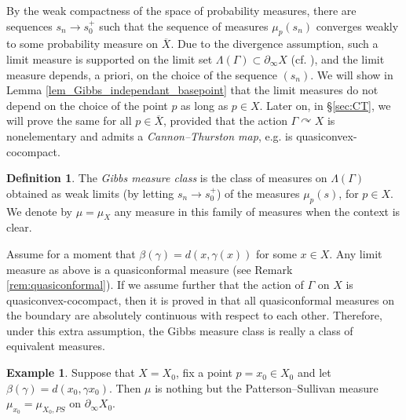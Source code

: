 \documentclass[12pt]{amsbook}%
\theoremstyle{definition}
\newtheorem{defi}[thm]{Definition}
\newtheorem{example}[thm]{Example}
\theoremstyle{remark}
\numberwithin{section}{chapter}
\numberwithin{subsection}{section}
\numberwithin{figure}{chapter}
\DeclareMathOperator{\acts}{\curvearrowright}
\def\Ga{\Gamma}
\def\ga{\gamma}
\def\La{\Lambda}
\def\geo{\partial_\infty}
\def\ol{\overline}
\begin{document}
{{ By the weak compactness of the space of probability measures, there are sequences $s_n\rightarrow s_0^+$ such that the sequence of measures  $\mu_{p}(s_n)$ converges weakly to some probability measure on $\overline{X}$. Due to the divergence assumption, such a limit measure is supported on the limit set $\La(\Ga)\subset \geo X$ (cf. \cite{Coo93}), and the limit measure depends, a priori, on the choice of the sequence $(s_n)$. We will show in Lemma \ref{lem_Gibbs_independant_basepoint} that the limit measures do not depend on the choice of the point $p$ as long as $p\in X$.  Later on, in \S \ref{sec:CT}, we will prove the same for all $p\in \ol{X}$, provided that the action $\Ga\acts X$ is nonelementary and admits a 
 {\em Cannon--Thurston map}, e.g. is quasiconvex-cocompact. 
 
 \begin{defi}
\label{defi_Gibbs} %
The {\em Gibbs measure class} is the class of measures on $\La(\Ga)$ obtained as weak limits (by letting $s_n\rightarrow s_0^+$) of the measures  $\mu_p(s)$, for $p\in X$. We denote by $\mu=\mu_{X}$ any measure in this family of measures when the context is clear. %
\end{defi}
 
 Assume for a moment that $\beta(\gamma)=d(x,\gamma(x))$ for some $x\in X$. Any limit measure as above is a quasiconformal 
 measure (see Remark \ref{rem:quasiconformal}). If we assume further that the action of  $\Gamma$ on $X$ is quasiconvex-cocompact, then it is proved in \cite[Th\'eor\`eme 7.7 assertion (3)]{Coo93} that all quasiconformal measures on the boundary are absolutely continuous with respect to each other. Therefore, under this extra assumption, %
 the Gibbs measure class is really a class of equivalent measures. %
 

\begin{example}
Suppose that $X=X_0$, fix a point $p=x_0\in X_0$ and let 
$\beta(\ga)=d(x_0, \ga x_0)$. Then $\mu$ is nothing but the Patterson--Sullivan measure 
$\mu_{x_0}=\mu_{X_0,PS}$ on $\geo X_0$.  
\end{example}


}}
\end{document}
